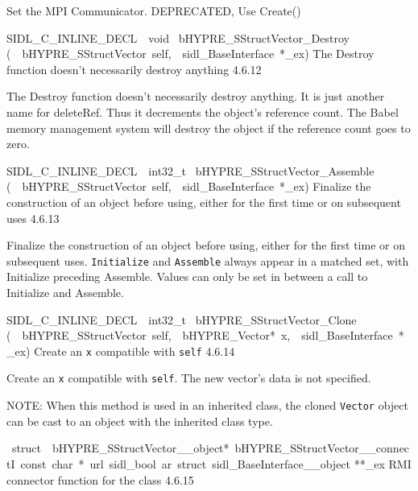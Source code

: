 \documentclass{article}
\begin{document}
\begin{cxxentry}
\begin{cxxentry}
\begin{cxxfunction}
\begin{cxxdoc}
Set the MPI Communicator.  DEPRECATED, Use Create()
\end{cxxdoc}
\end{cxxfunction}
\begin{cxxfunction}
{SIDL\_C\_INLINE\_DECL\ \ void\ }
        {bHYPRE\_SStructVector\_Destroy}
        {(\ \ bHYPRE\_SStructVector\ self,\ \ sidl\_BaseInterface\ *\_ex)}
        {
The Destroy function doesn't necessarily destroy anything}
        {4.6.12}
\begin{cxxdoc}

The Destroy function doesn't necessarily destroy anything.
It is just another name for deleteRef.  Thus it decrements the
object's reference count.  The Babel memory management system will
destroy the object if the reference count goes to zero.
\end{cxxdoc}
\end{cxxfunction}
\begin{cxxfunction}
{SIDL\_C\_INLINE\_DECL\ \ int32\_t\ }
        {bHYPRE\_SStructVector\_Assemble}
        {(\ \ bHYPRE\_SStructVector\ self,\ \ sidl\_BaseInterface\ *\_ex)}
        {
Finalize the construction of an object before using, either
for the first time or on subsequent uses}
        {4.6.13}
\begin{cxxdoc}

Finalize the construction of an object before using, either
for the first time or on subsequent uses. {\tt Initialize}
and {\tt Assemble} always appear in a matched set, with
Initialize preceding Assemble. Values can only be set in
between a call to Initialize and Assemble.
\end{cxxdoc}
\end{cxxfunction}
\begin{cxxfunction}
{SIDL\_C\_INLINE\_DECL\ \ int32\_t\ }
        {bHYPRE\_SStructVector\_Clone}
        {(\ \ bHYPRE\_SStructVector\ self,\ \ bHYPRE\_Vector*\ x,\ \ sidl\_BaseInterface\ *\_ex)}
        {
Create an {\tt x} compatible with {\tt self}}
        {4.6.14}
\begin{cxxdoc}

Create an {\tt x} compatible with {\tt self}.
The new vector's data is not specified.

NOTE: When this method is used in an inherited class, the
cloned {\tt Vector} object can be cast to an object with the
inherited class type.
\end{cxxdoc}
\end{cxxfunction}
\begin{cxxvariable}
{\ struct\ \ bHYPRE\_SStructVector\_\_object*\ bHYPRE\_SStructVector\_\_connectI\ const\ char\ *\ url\ sidl\_bool\ ar\ struct\ sidl\_BaseInterface\_\_object}
        {**\_ex}
        {}
        {
RMI connector function for the class}
        {4.6.15}
\begin{cxxdoc}


\end{cxxdoc}
\end{cxxvariable}
\end{cxxentry}
\end{cxxentry}
\end{document}
